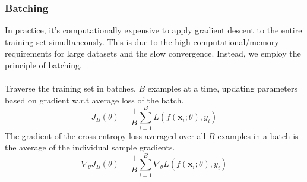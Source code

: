 \documentclass[11pt]{article}
\begin{document}
\subsubsection{Batching}
In practice, it's computationally expensive to apply gradient descent to the entire training set simultaneously. This is due to the high computational/memory requirements for large datasets and the slow convergence. Instead, we employ the principle of batching. \\\\
Traverse the training set in batches, $B$ examples at a time, updating parameters based on gradient w.r.t average loss of the batch.
$$
J_B(\theta)=\frac{1}{B}\sum_{i=1}^{B}L(f(\mathbf{x}_i;\theta), y_i)
$$
The gradient of the cross-entropy loss averaged over all $B$ examples in a batch is the average of the individual sample gradients.
$$
\nabla_{\theta}J_B(\theta)=\frac{1}{B}\sum_{i=1}^{B}\nabla_{\theta}L(f(\mathbf{x}_i;\theta), y_i)
$$
\end{document}

